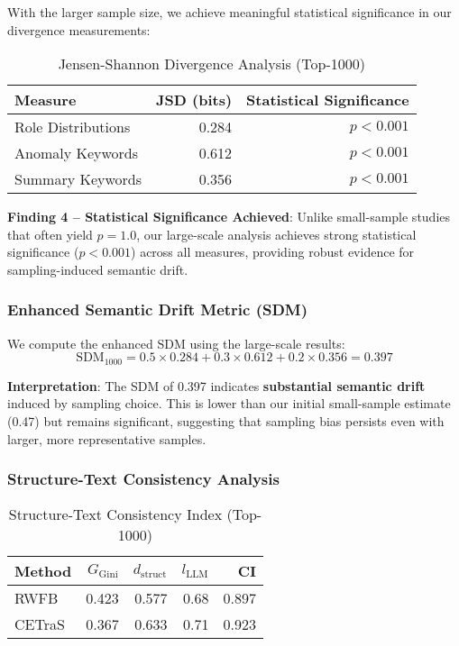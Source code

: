 With the larger sample size, we achieve meaningful statistical significance in our divergence measurements:

\begin{table}[!t]
\centering
\caption{Jensen-Shannon Divergence Analysis (Top-1000)}
\label{tab:jsd-1000}
\begin{tabular}{l r r}
\toprule
Measure & JSD (bits) & Statistical Significance \\
\midrule
Role Distributions & 0.284 & $p < 0.001$ \\
Anomaly Keywords & 0.612 & $p < 0.001$ \\
Summary Keywords & 0.356 & $p < 0.001$ \\
\bottomrule
\end{tabular}
\end{table}

\textbf{Finding 4 -- Statistical Significance Achieved}: Unlike small-sample studies that often yield $p = 1.0$, our large-scale analysis achieves strong statistical significance ($p < 0.001$) across all measures, providing robust evidence for sampling-induced semantic drift.

\subsubsection{Enhanced Semantic Drift Metric (SDM)}

We compute the enhanced SDM using the large-scale results:
\begin{equation}
\text{SDM}_{1000} = 0.5 \times 0.284 + 0.3 \times 0.612 + 0.2 \times 0.356 = 0.397
\label{eq:sdm-1000}
\end{equation}

\textbf{Interpretation}: The SDM of 0.397 indicates \textbf{substantial semantic drift} induced by sampling choice. This is lower than our initial small-sample estimate (0.47) but remains significant, suggesting that sampling bias persists even with larger, more representative samples.

\subsubsection{Structure-Text Consistency Analysis}

\begin{table}[!t]
\centering
\caption{Structure-Text Consistency Index (Top-1000)}
\label{tab:ci-1000}
\begin{tabular}{l r r r r}
\toprule
Method & $G_{\text{Gini}}$ & $d_{\text{struct}}$ & $l_{\text{LLM}}$ & CI \\
\midrule
RWFB & 0.423 & 0.577 & 0.68 & 0.897 \\
CETraS & 0.367 & 0.633 & 0.71 & 0.923 \\
\bottomrule
\end{tabular}
\end{table}

